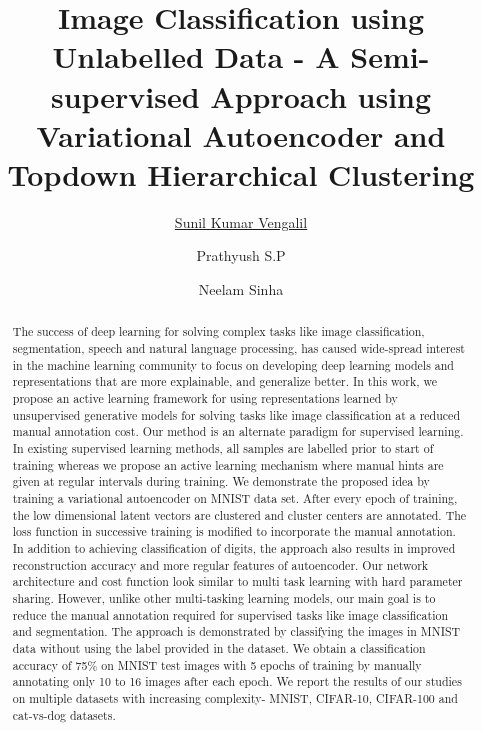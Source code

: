 \documentclass{uai2021} %
\title{Image Classification using Unlabelled Data - A Semi-supervised Approach using Variational Autoencoder and Topdown Hierarchical Clustering}
\author[1]{\href{mailto:Sunil Kumar Vengalil <sunilkumar.vengalil@iiitb.org> ?Subject=Your UAI 2021 paper}{Sunil Kumar Vengalil}{}}
\author[2]{Prathyush S.P}
\author[1]{Neelam Sinha}
\affil[1]{%
    International Institute of Information Technology Bangalore\\
}
\affil[2]{%
    Worcester Polytechnic Institute \\
   100 Institute Rd, Worcester, MA 01609, United States
}
\begin{document}
\maketitle

\begin{abstract}
The success of deep learning for solving complex tasks like image classification, segmentation, speech and natural language processing, has caused wide-spread interest in the machine learning community to focus on developing deep learning models and representations that are more explainable, and generalize better. In this work, we propose an active learning framework for using representations learned by unsupervised generative models for solving tasks like image classification at a reduced manual annotation cost. Our method is an alternate paradigm for supervised learning. In existing supervised learning methods,  all samples are labelled prior to start of training whereas we propose an active learning mechanism where manual hints are given at regular intervals during training. We demonstrate the proposed idea by training a  variational autoencoder on MNIST data set. After every epoch of training, the low dimensional latent vectors are clustered and cluster centers are annotated. The loss function in successive training is modified to incorporate the manual annotation. In addition to achieving classification of digits, the approach also results in improved reconstruction accuracy and more regular features of autoencoder. Our network architecture and cost function look similar to multi task learning with hard parameter sharing. However, unlike other multi-tasking learning models, our main goal is to reduce the manual annotation required for supervised tasks like image classification and segmentation. The approach is demonstrated by classifying the images in MNIST data without using the label provided in the dataset. We obtain a classification accuracy of 75\% on MNIST test images with 5 epochs of training by manually annotating only 10 to 16 images after each epoch. We report the results of our studies on multiple datasets with increasing complexity- MNIST, CIFAR-10, CIFAR-100 and cat-vs-dog datasets.
\end{abstract}
\end{document}
